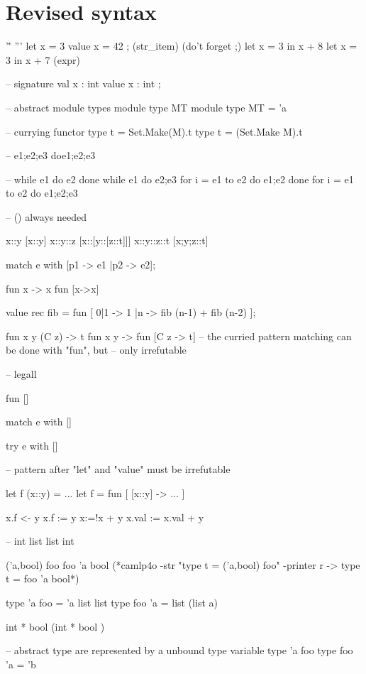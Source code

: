 \section{Revised syntax}


\begin{alternate}
  '\''
  '''
  let x = 3
  value  x = 42 ; (str_item) (do't forget ;)
  let x = 3 in x + 8
  let x = 3 in x + 7 (expr)

  -- signature
  val x : int
  value x : int ;

  -- abstract module types
  module type MT
  module type MT = 'a

  -- currying functor 
  type t = Set.Make(M).t
  type t = (Set.Make M).t

  --
  e1;e2;e3
  do{e1;e2;e3}

  --
  while e1 do e2 done
  while e1 do {e2;e3 }
  for i = e1 to e2 do e1;e2 done
  for i = e1 to e2 do {e1;e2;e3}

  --
  () always needed

  x::y
  [x::y]
  x::y::z
  [x::[y::[z::t]]]
  x::y::z::t
  [x;y;z::t]

  match e with
  [p1 -> e1
  |p2 -> e2];


  fun x -> x
  fun [x->x]

  
  value rec  fib = fun [
  0|1  -> 1 
  |n -> fib (n-1) + fib (n-2)
  ];


  fun x y (C z) -> t
  fun x y -> fun [C z -> t]
  -- the curried pattern matching can be done with "fun", but
  -- only irrefutable

  -- legall

  fun []

  match e with []

  try e with []


  -- pattern after "let" and "value" must be irrefutable

  let f (x::y) = ...
  let f = fun [ [x::y] ->  ... ]


  x.f <- y
  x.f := y
  x:=!x + y
  x.val := x.val + y

  --
  int list
  list int


  ('a,bool) foo
  foo 'a bool (*camlp4o -str "type t = ('a,bool) foo" -printer r  -> type t = foo 'a bool*)

  type 'a foo = 'a list list
  type foo 'a = list (list a)

  int * bool
  (int * bool )


  -- abstract type are represented by a unbound type variable
  type 'a foo
  type foo 'a = 'b


\end{alternate}
